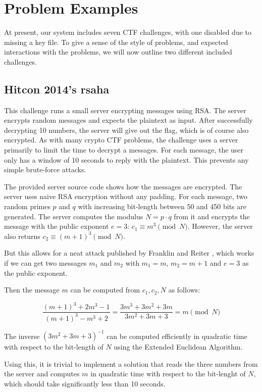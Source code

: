 \section{Problem Examples}
At present, our system includes seven CTF challenges, with one
disabled due to missing a key file. To give a sense of the style of
problems, and expected interactions with the problems, we will now
outline two different included challenges.

\subsection{Hitcon 2014's rsaha}
This challenge runs a small server encrypting messages using RSA. The
server encrypts random messages and expects the plaintext as
input. After successfully decrypting 10 numbers, the server will give
out the flag, which is of course also encrypted. As with many crypto
CTF problems, the challenge uses a server primarily to limit the time
to decrypt a messages. For each message, the user only has a window of
10 seconds to reply with the plaintext. This prevents any simple
brute-force attacks.

The provided server source code shows how the messages are
encrypted. The server uses naive RSA encryption without any
padding. For each message, two random primes $p$ and $q$ with
increasing bit-length between 50 and 450 bits are generated. The server
computes the modulus $N=p\cdot q$ from it and encrypts the message
with the public exponent $e=3$: $c_1\equiv m^3 \pmod{N}$. However, the
server also returns $c_2\equiv (m+1)^3\pmod{N}$.

But this allows for a neat attack published by Franklin and Reiter
\cite{franklin1995linear}, which works if we can get two messages $m_1$
and $m_2$ with $m_1 = m$, $m_2 = m+1$ and $e=3$ as the public exponent.

Then the message $m$ can be computed from $c_1, c_2, N$ as follows:

\[ \frac{(m+1)^3+2m^3-1}{(m+1)^3-m^3+2} =
\frac{3m^3+3m^2+3m}{3m^2+3m+3} = m \pmod{N}
\]

The inverse $(3m^2+3m+3)^{-1}$ can be computed efficiently in quadratic time
with respect to the bit-length of $N$ using the Extended Euclidean Algorithm.

Using this, it is trivial to implement a solution that reads the three numbers
from the server and computes $m$ in quadratic time with respect to the
bit-lenght of $N$, which should take significantly less than 10 seconds.

